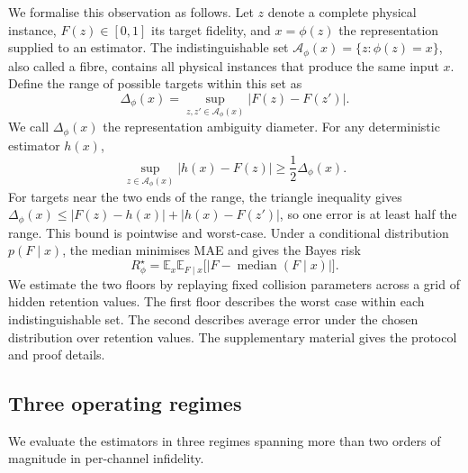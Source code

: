\documentclass[12pt]{iopart}
\providecommand{\tfrac}[2]{\frac{#1}{#2}}
\begin{document}
We formalise this observation as follows. Let $z$ denote a complete physical instance, $F(z)\in[0,1]$ its target fidelity, and $x=\phi(z)$ the representation supplied to an estimator. The indistinguishable set
$\mathcal{A}_{\phi}(x)=\{z:\phi(z)=x\}$, also called a fibre, contains all physical instances that produce the same input $x$. Define the range of possible targets within this set as
\begin{equation}
\Delta_{\phi}(x)=\sup_{z,z'\in\mathcal{A}_{\phi}(x)} |F(z)-F(z')|.
\label{eq:ambiguity_diameter}
\end{equation}
We call $\Delta_{\phi}(x)$ the representation ambiguity diameter. For any deterministic estimator $h(x)$,
\begin{equation}
\sup_{z\in\mathcal{A}_{\phi}(x)} |h(x)-F(z)|\geq \tfrac{1}{2}\Delta_{\phi}(x).
\label{eq:minimax_floor}
\end{equation}
For targets near the two ends of the range, the triangle inequality gives $\Delta_{\phi}(x)\leq |F(z)-h(x)|+|h(x)-F(z')|$, so one error is at least half the range. This bound is pointwise and worst-case. Under a conditional distribution $p(F\mid x)$, the median minimises MAE and gives the Bayes risk
\begin{equation}
R^{\star}_{\phi}=\mathbb{E}_{x}\mathbb{E}_{F\mid x}
\bigl[|F-\mathop{\mathrm{median}}(F\mid x)|\bigr].
\label{eq:bayes_floor}
\end{equation}
We estimate the two floors by replaying fixed collision parameters across a grid of hidden retention values. The first floor describes the worst case within each indistinguishable set. The second describes average error under the chosen distribution over retention values. The supplementary material gives the protocol and proof details.

\subsection{Three operating regimes}

We evaluate the estimators in three regimes spanning more than two orders of magnitude in per-channel infidelity.
\end{document}

